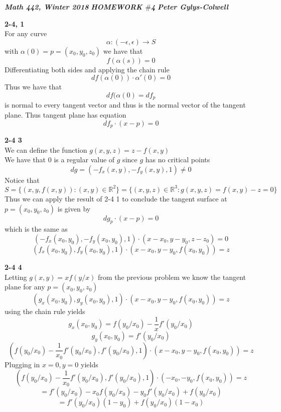 \documentclass[12pt]{article}
\newenvironment{ques}[1]{\textbf{#1}\vspace{1 mm}\\ }{\bigskip}
\theoremstyle{definition}
\newcommand{\R}{\mathbb R}
\renewcommand{\a}{\alpha}
\begin{document}
\noindent \textit{\textbf{Math 442, Winter 2018}} \hspace{1.3cm}
\textit{\textbf{HOMEWORK $\#$4}} \hspace{1.3cm} \textit{\textbf{Peter
Gylys-Colwell}} 

\vspace{1cm}

\begin{ques}{2-4, 1}
	For any curve
	$$\a:(-\epsilon, \epsilon) \to S$$
	with $\a(0) = p = (x_0,y_0,z_0)$ we have that
	$$f(\a(s)) = 0$$
	Differentiating both sides and applying the chain rule
	$$df(\a(0))\cdot \a'(0)=0$$
	Thus we have that 
	$$df(\a(0) = df_p$$
	is normal to every tangent vector and thus is the normal vector of the
	tangent plane. Thus tangent plane has equation
	$$df_p \cdot (x - p) = 0$$
\end{ques}

\begin{ques}{2-4 3}
	We can define the function $g(x,y,z) = z - f(x,y)$\\
	We have that $0$ is a regular value of $g$ since $g$ has no critical points
	$$dg = (-f_x(x,y), -f_y(x,y), 1) \neq 0$$
	Notice that 
	$$S = \{(x,y,f(x,y)): (x,y) \in \R^2\} = \{(x,y,z) \in \R^3: g(x,y,z) =
	f(x,y) - z = 0\}$$
	Thus we can apply the result of 2-4 1 to conclude the tangent surface at $p
	= (x_0,y_0,z_0)$ is given by
	$$dg_p \cdot (x - p) = 0$$
	which is the same as
	$$(-f_{x}(x_0,y_0), -f_{y}(x_0,y_0), 1) \cdot (x - x_0,y - y_0,z - z_0) = 0$$
	$$(f_{x}(x_0,y_0), f_{y}(x_0,y_0), 1) \cdot (x - x_0,y - y_0, f(x_0,y_0)) = z$$
\end{ques}

\begin{ques}{2-4 4}
	Letting $g(x,y) = xf(y/x)$ from the previous problem we know the tangent
	plane for any $p = (x_0, y_0, z_0)$
	$$(g_{x}(x_0,y_0), g_{y}(x_0,y_0), 1) \cdot (x - x_0,y - y_0, f(x_0,y_0)) = z$$
	using the chain rule yields
	$$g_x(x_0,y_0) = f(y_0/x_0) - \frac 1 x f'(y_0/x_0)$$
	$$g_y(x_0,y_0) = f'(y_0/x_0)$$
	$$(f(y_0/x_0) - \frac 1 {x_0} f'(y_0/x_0), f'(y_0/x_0), 1) \cdot (x - x_0,y
	- y_0, f(x_0,y_0)) = z$$
	Plugging in $x=0,y = 0$ yields
	$$(f(y_0/x_0) - \frac 1 {x_0} f'(y_0/x_0), f'(y_0/x_0), 1) \cdot (- x_0,
	- y_0, f(x_0,y_0)) = z$$
	$$= f'(y_0/x_0) - x_0f(y_0/x_0) - y_0f'(y_0/x_0) + f(y_0/x_0)$$
	$$= f'(y_0/x_0)(1-y_0) + f(y_0/x_0)(1 - x_0)$$
\end{ques}
\end{document}
